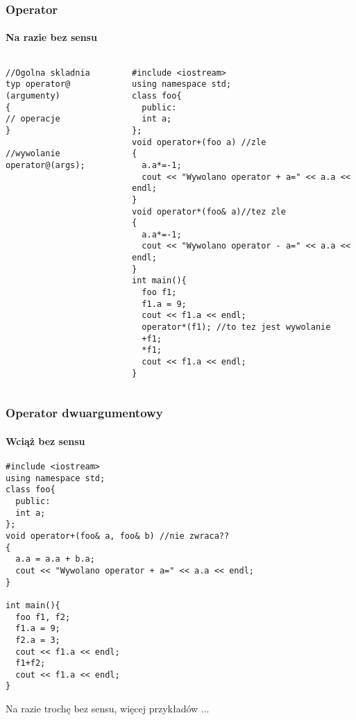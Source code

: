 \documentclass[10pt]{beamer}
\begin{document}
\begin{frame}[fragile]
  \frametitle{Operator}
  \framesubtitle{Na razie bez sensu}
  \begin{columns}
    \begin{column}{0.48\textwidth}
\begin{lstlisting}
//Ogolna skladnia
typ operator@ (argumenty)
{
// operacje 
}

//wywolanie
operator@(args);
\end{lstlisting}
    \end{column}
    \begin{column}{0.48\textwidth}
    \begin{lstlisting}
#include <iostream>
using namespace std;
class foo{
  public:
  int a;
};
void operator+(foo a) //zle
{
  a.a*=-1;
  cout << "Wywolano operator + a=" << a.a << endl;
}
void operator*(foo& a)//tez zle
{
  a.a*=-1;
  cout << "Wywolano operator - a=" << a.a << endl;
}
int main(){
  foo f1;
  f1.a = 9;
  cout << f1.a << endl;
  operator*(f1); //to tez jest wywolanie
  +f1;
  *f1;
  cout << f1.a << endl;
}
\end{lstlisting}
    \end{column}
  \end{columns}
\end{frame}

\begin{frame}[fragile]
  \frametitle{Operator dwuargumentowy}
  \framesubtitle{Wciąż bez sensu}

\begin{lstlisting}
#include <iostream>
using namespace std;
class foo{
  public:
  int a;
};
void operator+(foo& a, foo& b) //nie zwraca??
{
  a.a = a.a + b.a;
  cout << "Wywolano operator + a=" << a.a << endl;
}

int main(){
  foo f1, f2;
  f1.a = 9;
  f2.a = 3;
  cout << f1.a << endl;
  f1+f2;
  cout << f1.a << endl;
}
\end{lstlisting}
Na razie trochę bez sensu, więcej przykładów ...
\end{frame}
\end{document}
